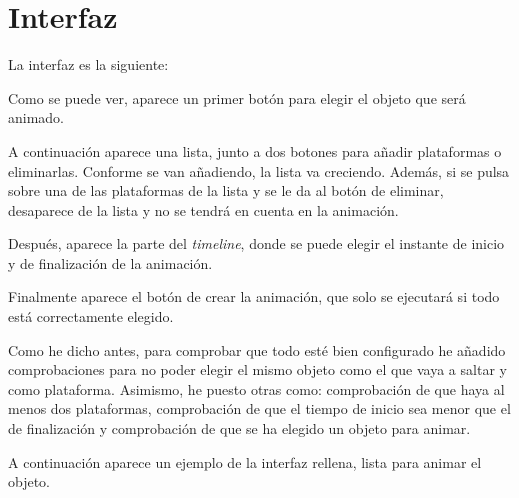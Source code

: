\section{Interfaz}

La interfaz es la siguiente:


Como se puede ver, aparece un primer botón para elegir el objeto que será animado.

\bigskip

A continuación aparece una lista, junto a dos botones para añadir plataformas o eliminarlas. Conforme se van añadiendo, la lista va creciendo. Además, si se pulsa sobre una de las plataformas de la lista y se le da al botón de eliminar, desaparece de la lista y no se tendrá en cuenta en la animación.

\bigskip

Después, aparece la parte del \textit{timeline}, donde se puede elegir el instante de inicio y de finalización de la animación.

\bigskip

Finalmente aparece el botón de crear la animación, que solo se ejecutará si todo está correctamente elegido.

\bigskip

Como he dicho antes, para comprobar que todo esté bien configurado he añadido comprobaciones para no poder elegir el mismo objeto como el que vaya a saltar y como plataforma. Asimismo, he puesto otras como: comprobación de que haya al menos dos plataformas, comprobación de que el tiempo de inicio sea menor que el de finalización y comprobación de que se ha elegido un objeto para animar.



\bigskip

A continuación aparece un ejemplo de la interfaz rellena, lista para animar el objeto.

